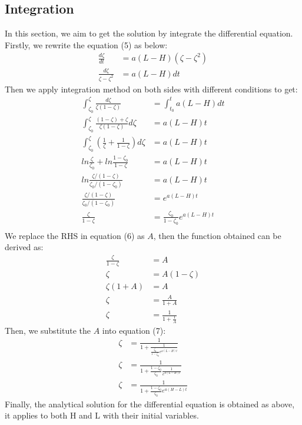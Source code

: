 \documentclass[a4paper, 12pt]{article}
\begin{document}
\subsection{Integration}
In this section, we aim to get the solution by integrate the differential equation. Firstly, we rewrite the equation (5) as below:
\vspace{-3mm}
\begin{equation}
\begin{split}
	\frac{d \zeta}{dt} &= a(L-H)( \zeta - \zeta^{2}) \\
	\frac{d \zeta}{\zeta-\zeta^{2}}&=a(L-H)dt
\end{split}
\end{equation}
Then we apply integration method on both sides with different conditions to get:
\vspace{-3mm}
\begin{equation}
\begin{split}
	\int_{\zeta_{0}}^{\zeta} \frac{d\zeta}{\zeta(1-\zeta)} &= \int_{t_{0}}^{t} a(L-H)dt \\
	\int_{\zeta_{0}}^{\zeta} \frac{(1-\zeta)+\zeta}{\zeta(1-\zeta)}d\zeta & = a(L-H)t \\
	\int_{\zeta_{0}}^{\zeta} (\frac{1}{\zeta} + \frac{1}{1-\zeta})d\zeta &= a(L-H)t \\
	ln\frac{\zeta}{\zeta_{0}} + ln\frac{1-\zeta_{0}}{1-\zeta} & = a(L-H)t \\
	ln\frac{\zeta/(1-\zeta)}{\zeta_{0}/(1-\zeta_{0})} & = a(L-H)t \\
	\frac{\zeta/(1-\zeta)}{\zeta_{0}/(1-\zeta_{0})} & = e^{a(L-H)t} \\
	\frac{\zeta}{1-\zeta} & = \frac{\zeta_{0}}{1-\zeta_{0}}e^{a(L-H)t} \\
\end{split}
\end{equation}
We replace the RHS in equation (6) as $A$, then the function obtained can be derived as:
\begin{equation}
\begin{split}
	\frac{\zeta}{1-\zeta} &= A \\
	\zeta & = A (1-\zeta) \\
	\zeta (1+A) & = A \\
	\zeta & = \frac{A}{1+A} \\
	\zeta & = \frac{1}{1 + \frac{1}{A}}
\end{split}
\end{equation}
Then, we substitute the $A$ into equation (7):
\begin{equation}
\begin{split}
	\zeta &= \frac{1}{1+\frac{1}{\frac{\zeta_{0}}{1-\zeta_{0}}e^{a(L-H)t}}} \\
	\zeta &= \frac{1}{1+\frac{1-\zeta_{0}}{\zeta_{0}}\frac{1}{e^{a(L-H)t}}} \\
	\zeta &= \frac{1}{1+\frac{1-\zeta_{0}}{\zeta_{0}}e^{a(H-L)t}}
\end{split}
\end{equation}
Finally, the analytical solution for the differential equation is obtained as above, it applies to both H and L with their initial variables.
\end{document}
